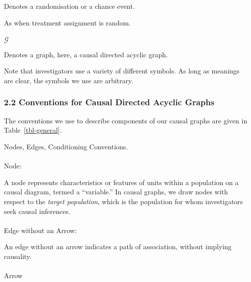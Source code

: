 \documentclass[
  single column]{article}
\makeatletter
\let\oldparagraph\paragraph
\renewcommand{\paragraph}{
    \@ifstar
      \xxxParagraphStar
      \xxxParagraphNoStar
  }
\newcommand{\xxxParagraphStar}[1]{\oldparagraph*{#1}\mbox{}}
\newcommand{\xxxParagraphNoStar}[1]{\oldparagraph{#1}\mbox{}}
\makeatother
\begin{document}
Denotes a randomisation or a chance event.

As when treatment assignment is random.

\paragraph{\texorpdfstring{\(\mathcal{G}\)}{\textbackslash mathcal\{G\}}}\label{mathcalg}

Denotes a graph, here, a causal directed acyclic graph.

Note that investigators use a variety of different symbols. As long as
meanings are clear, the symbols we use are arbitrary.

\subsubsection{2.2 Conventions for Causal Directed Acyclic
Graphs}\label{conventions-for-causal-directed-acyclic-graphs}

The conventions we use to describe components of our causal graphs are
given in Table~\ref{tbl-general}.

\begin{table}

\caption{\label{tbl-general}Nodes, Edges, Conditioning Conventions.}

\centering{

\terminologygeneraldags

}

\end{table}%

\paragraph{Node:}\label{node}

A node represents characteristics or features of units within a
population on a causal diagram, termed a ``variable.'' In causal graphs,
we draw nodes with respect to the \emph{target population}, which is the
population for whom investigators seek causal inferences.

\paragraph{Edge without an Arrow:}\label{edge-without-an-arrow}

An edge without an arrow indicates a path of association, without
implying causality.

\paragraph{Arrow}\label{arrow}
\end{document}
